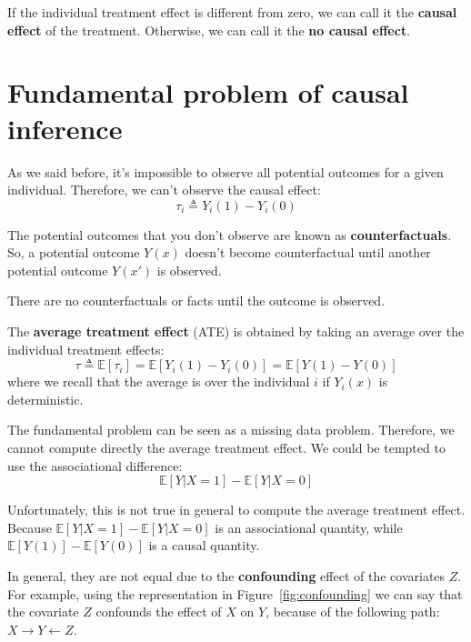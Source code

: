 \begin{note}
    If the individual treatment effect is different from zero, we can call it
    the \textbf{causal effect} of the treatment. Otherwise, we can call it the
    \textbf{no causal effect}.
\end{note}

\section{Fundamental problem of causal inference}
As we said before, it's impossible to observe all potential outcomes for a given
individual. Therefore, we can't observe the causal effect:
\begin{equation*}
    \tau_i \triangleq Y_i(1) - Y_i(0)
\end{equation*}

The potential outcomes that you don't observe are known as \textbf{counterfactuals}.
So, a potential outcome $Y(x)$ doesn't become counterfactual until another
potential outcome $Y(x')$ is observed.

\begin{note}
    There are no counterfactuals or facts until the outcome is observed.
\end{note}
\begin{definition}
    The \textbf{average treatment effect} (ATE) is obtained by taking an average
    over the individual treatment effects:
    \begin{equation}
        \tau \triangleq \mathbb{E}[\tau_i] = \mathbb{E}[Y_i(1) - Y_i(0)] = \mathbb{E}[Y(1) - Y(0)]
    \end{equation}
    where we recall that the average is over the individual $i$ if $Y_i(x)$ is
    deterministic.
\end{definition}

The fundamental problem can be seen as a missing data problem. Therefore, we cannot
compute directly the average treatment effect. We could be tempted to use the
associational difference:
\begin{equation}
    \mathbb{E}[Y|X = 1] - \mathbb{E}[Y|X = 0]
\end{equation}

Unfortunately, this is not true in general to compute the average treatment effect.
Because $\mathbb{E}[Y|X = 1] - \mathbb{E}[Y|X = 0]$ is an associational quantity,
while $\mathbb{E}[Y(1)] - \mathbb{E}[Y(0)]$ is a causal quantity.

In general, they are not equal due to the \textbf{confounding} effect of the covariates
$Z$. For example, using the representation in Figure~\ref{fig:confounding} we can
say that the covariate $Z$ confounds the effect of $X$ on $Y$, because of the
following path: $X \rightarrow Y \leftarrow Z$.

